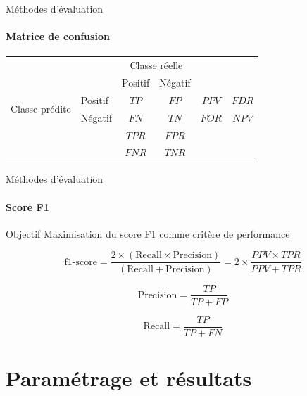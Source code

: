 \documentclass[usenames,dvipsnames]{beamer}
\begin{document}
\begin{frame}{Méthodes d'évaluation}
\framesubtitle{Matrice de confusion}

\begin{tabular}{ l | l | c | c | c c}
\multicolumn{2}{c}{} & \multicolumn{2}{c}{Classe réelle} & \\
\cline{3-4}
\multicolumn{2}{c|}{} & Positif & Négatif \\
\cline{2-4}
\multirow{2}{*}{Classe prédite} & Positif & $TP$ & $FP$ & $PPV$ & $FDR$ \\
\cline{2-4}
& Négatif & $FN$ & $TN$ & $FOR$ & $NPV$ \\
\cline{2-4}
\multicolumn{1}{r}{} & \multicolumn{1}{l}{} & \multicolumn{1}{c}{$TPR$} & \multicolumn{1}{c}{$FPR$} \\
\multicolumn{1}{l}{} & \multicolumn{1}{l}{} & \multicolumn{1}{c}{$FNR$} & \multicolumn{1}{c}{$TNR$} \\
\end{tabular}

\end{frame}

\begin{frame}{Méthodes d'évaluation}
\framesubtitle{Score F1}

\begin{block}{Objectif}
Maximisation du score F1 comme critère de performance
\end{block}

\begin{equation}
\text{f1-score} = \dfrac{2\times(\text{Recall} \times \text{Precision})}{(\text{Recall} + \text{Precision})} = 2\times\dfrac{PPV \times TPR}{PPV + TPR}
\end{equation}

\begin{equation}
\text{Precision} = \dfrac{TP}{TP+FP}
\end{equation}

\begin{equation}
\text{Recall} = \dfrac{TP}{TP+FN}
\end{equation}

\end{frame}

\section{Paramétrage et résultats}
\end{document}
